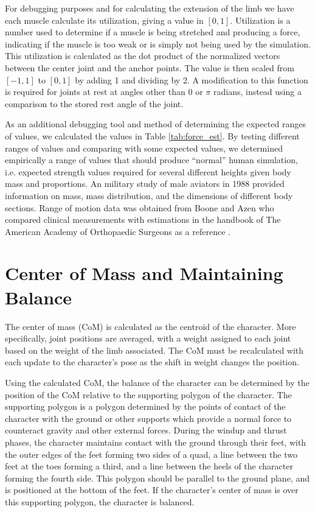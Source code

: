 For debugging purposes and for calculating the extension of the limb we have each muscle calculate its utilization, giving a value in $[0,1]$.  Utilization is a number used to determine if a muscle is being stretched and producing a force, indicating if the muscle is too weak or is simply not being used by the simulation.  This utilization is calculated as the dot product of the normalized vectors between the center joint and the anchor points.  The value is then scaled from $[-1, 1]$ to $[0,1]$ by adding 1 and dividing by 2.  A modification to this function is required for joints at rest at angles other than 0 or $\pi$ radians, instead using a comparison to the stored rest angle of the joint.

As an additional debugging tool and method of determining the expected ranges of values, we calculated the values in Table \ref{tab:force_est}.  By testing different ranges of values and comparing with some expected values, we determined empirically a range of values that should produce ``normal'' human simulation, i.e. expected strength values required for several different heights given body mass and proportions.  An military study of male aviators in 1988 provided information on mass, mass distribution, and the dimensions of different body sections.  Range of motion data was obtained from Boone and Azen who compared clinical measurements with estimations in the handbook of The American Academy of Orthopaedic Surgeons as a reference \cite{Boone756}.


\section{Center of Mass and Maintaining Balance}
\label{section:com}
The center of mass (CoM) is calculated as the centroid of the character.  More specifically, joint positions are averaged, with a weight assigned to each joint based on the weight of the limb associated.  The CoM must be recalculated with each update to the character's pose as the shift in weight changes the position.

Using the calculated CoM, the balance of the character can be determined by the position of the CoM relative to the supporting polygon of the character.  The supporting polygon is a polygon determined by the points of contact of the character with the ground or other supports which provide a normal force to counteract gravity and other external forces.  During the windup and thrust phases, the character maintains contact with the ground through their feet, with the outer edges of the feet forming two sides of a quad, a line between the two feet at the toes forming a third, and a line between the heels of the character forming the fourth side.  This polygon should be parallel to the ground plane, and is positioned at the bottom of the feet.  If the character's center of mass is over this supporting polygon, the character is balanced.

